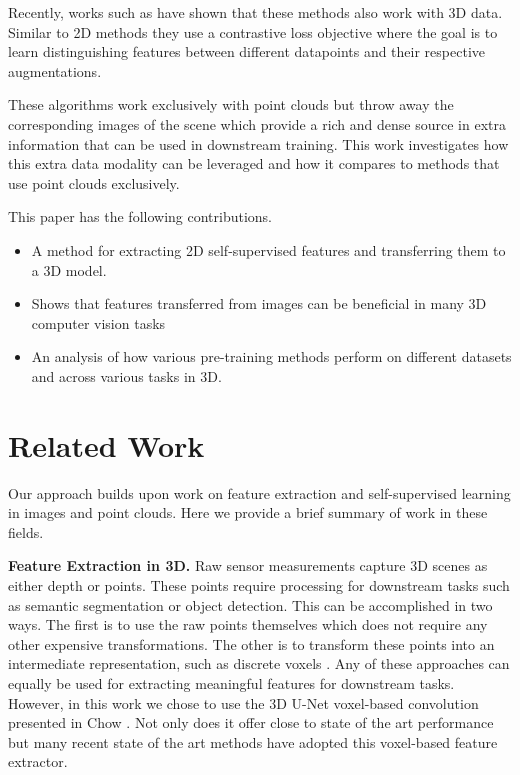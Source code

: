 \documentclass[10pt,twocolumn,letterpaper]{article}
\begin{document}
Recently, works such as \cite{xie2020pointcontrast} have shown that these methods also work with 3D data. Similar to 2D methods they use a contrastive loss objective where the goal is to learn distinguishing features between different datapoints and their respective augmentations.

These algorithms work exclusively with point clouds but throw away the corresponding images of the scene which provide a rich and dense source in extra information that can be used in downstream training. This work investigates how this extra data modality can be leveraged and how it compares to methods that use point clouds exclusively.

This paper has the following contributions.

\begin{itemize}
    \item A method for extracting 2D self-supervised features and transferring them to a 3D model.
    \item Shows that features transferred from images can be beneficial in many 3D computer vision tasks
    \item An analysis of how various pre-training methods perform on different datasets and across various tasks in 3D.
\end{itemize}

\section{Related Work}
\label{sec:relatedWork}

Our approach builds upon work on feature extraction and self-supervised learning in images and point clouds. Here we provide a brief summary of work in these fields.

\textbf{Feature Extraction in 3D.} Raw sensor measurements capture 3D scenes as either depth or points. These points require processing for downstream tasks such as semantic segmentation or object detection. This can be accomplished in two ways. The first is to use the raw points themselves \cite{charles2017PointNet, qi2017pointnet++, Tatarchenko2018TangentConvolutions, thomas2019KPConv, wu2019PointConv, engelmann2020Dilated, zhao2020point} which does not require any other expensive transformations. The other is to transform these points into an intermediate representation, such as discrete voxels \cite{cicek20163d, riegler2017octnet, graham20183D, choy20194d}. Any of these approaches can equally be used for extracting meaningful features for downstream tasks. However, in this work we chose to use the 3D U-Net voxel-based convolution presented in Chow \etal \cite{choy20194d}. Not only does it offer close to state of the art performance but many recent state of the art methods \cite{jiang2020pointgroup, chen2021hierarchical} have adopted this voxel-based feature extractor.
\end{document}
